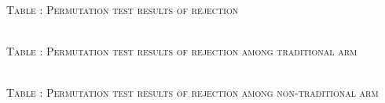 \hspace{-1.5cm}\begin{minipage}[t]{14cm}
\hfil\textsc{\normalsize Table \thetable: Permutation test results of rejection\label{tab reject perm}}\\
\setlength{\tabcolsep}{.5pt}
\setlength{\baselineskip}{8pt}
\renewcommand{\arraystretch}{.50}
\hfil{}\\

\hfil\textsc{\normalsize Table \thetable: Permutation test results of rejection among traditional arm\label{tab reject trad perm}}\\
\setlength{\tabcolsep}{.5pt}
\setlength{\baselineskip}{8pt}
\renewcommand{\arraystretch}{.50}
\hfil{}\\

\hfil\textsc{\normalsize Table \thetable: Permutation test results of rejection among non-traditional arm\label{tab reject nontrad perm}}\\
\setlength{\tabcolsep}{.5pt}
\setlength{\baselineskip}{8pt}
\renewcommand{\arraystretch}{.50}
\hfil{}\\


\end{minipage}
